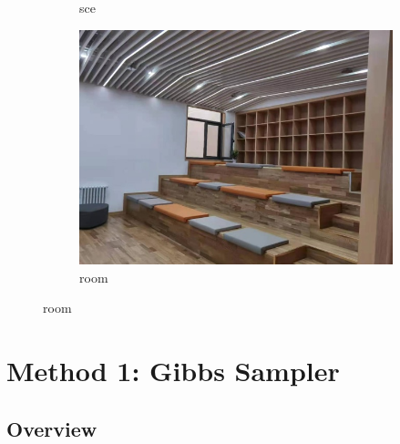 \documentclass[11pt]{article}
\begin{document}
\begin{figure}[ht!]
\begin{subfigure}[]{0.333\linewidth}
        \caption{sce}
    \end{subfigure}%
    \hfill%
    \begin{subfigure}[]{0.333\linewidth}
        \centering
        \includegraphics[width=\linewidth]{fig/room_ori.jpg}
        \caption{room}
    \end{subfigure}%
\end{figure}

\clearpage

\section{Method 1: Gibbs Sampler}

\subsection{Overview}
\end{document}
